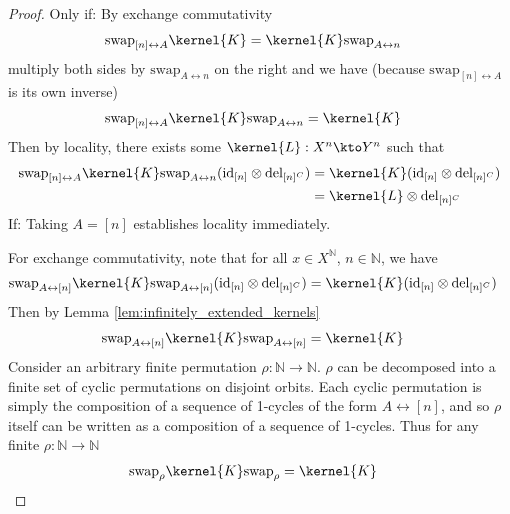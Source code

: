\begin{proof}
Only if:
By exchange commutativity
\begin{align}
	\text{swap}_{[n]\leftrightarrow A} \kernel{K} &= \kernel{K} \text{swap}_{A\leftrightarrow n}
\end{align}
multiply both sides by $\text{swap}_{A\leftrightarrow n}$ on the right and we have (because $\text{swap}_{[n]\leftrightarrow A}$ is its own inverse)
\begin{align}
		\text{swap}_{[n]\leftrightarrow A} \kernel{K}\text{swap}_{A\leftrightarrow n} &= \kernel{K}
\end{align}
Then by locality, there exists some $\kernel{L}:X^n\kto Y^n$ such that
\begin{align}
	\text{swap}_{[n]\leftrightarrow A} \kernel{K} \text{swap}_{A\leftrightarrow n} (\text{id}_{[n]}\otimes \text{del}_{[n]^C}) &= \kernel{K} (\text{id}_{[n]}\otimes \text{del}_{[n]^C})\\
	&=\kernel{L}\otimes \mathrm{del}_{[n]^C}
\end{align}
If:
Taking $A=[n]$ establishes locality immediately.

For exchange commutativity, note that for all $x\in X^{\mathbb{N}}$, $n\in\mathbb{N}$, we have
\begin{align}
	\text{swap}_{A\leftrightarrow [n]} \kernel{K} \text{swap}_{A\leftrightarrow [n]} (\text{id}_{[n]}\otimes \text{del}_{[n]^C}) &= \kernel{K}  (\text{id}_{[n]}\otimes \text{del}_{[n]^C})
\end{align}
Then by Lemma \ref{lem:infinitely_extended_kernels}
\begin{align}
	\text{swap}_{A\leftrightarrow [n]} \kernel{K} \text{swap}_{A\leftrightarrow [n]} &= \kernel{K}
\end{align}
Consider an arbitrary finite permutation $\rho:\mathbb{N}\to \mathbb{N}$. $\rho$ can be decomposed into a finite set of cyclic permutations on disjoint orbits. Each cyclic permutation is simply the composition of a sequence of 1-cycles of the form $A\leftrightarrow [n]$, and so $\rho$ itself can be written as a composition of a sequence of 1-cycles. Thus for any finite $\rho:\mathbb{N}\to\mathbb{N}$
\begin{align}
	\text{swap}_{\rho} \kernel{K} \text{swap}_{\rho} &= \kernel{K}
\end{align}
\end{proof}

